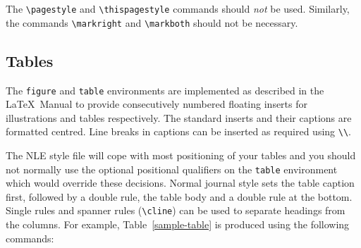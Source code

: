 \documentclass{nle}
\begin{document}
The \verb"\pagestyle" and \verb"\thispagestyle" commands should {\em not\/} be
used.
Similarly, the commands \verb"\markright" and \verb"\markboth" should not be
necessary.


\subsection{Tables}

The {\tt figure} and {\tt table} environments are implemented as described in
the \LaTeX\ Manual to
provide consecutively numbered floating inserts for illustrations and tables
respectively.
The standard inserts and their captions are formatted centred.
Line breaks in captions can be inserted as required using \verb"\\".

The NLE style file will cope with most positioning of your tables
and you should not normally use the optional positional qualifiers on the
\verb"table" environment which would override these decisions.
Normal journal style sets the table caption first, followed by a double
rule, the table body and a double rule at the bottom.  Single rules and
spanner rules (\verb"\cline") can be used to separate headings from the
columns.  For example, Table~\ref{sample-table} is produced using the
following commands:\par
%
\end{document}
